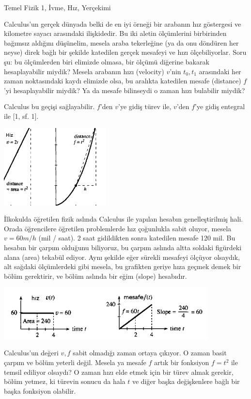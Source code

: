 \documentclass[12pt,fleqn]{article}\usepackage{../../common}
\begin{document}
Temel Fizik 1, İvme, Hız, Yerçekimi

Calculus'un gerçek dünyada belki de en iyi örneği bir arabanın hız
göstergesi ve kilometre sayacı arasındaki ilişkidedir. Bu iki aletin
ölçümlerini birbirinden bağımsız aldığını düşünelim, mesela araba
tekerleğine (ya da onu döndüren her neyse) direk bağlı bir şekilde
katedilen gerçek mesafeyi ve hızı ölçebiliyorlar. Soru şu: bu ölçümlerden
biri elimizde olmasa, bir ölçümü diğerine bakarak hesaplayabilir miydik?
Mesela arabanın hızı (velocity) $v$'nin $t_0,t_1$ arasındaki her zaman
noktasındaki kaydı elimizde olsa, bu aralıkta katedilen mesafe (distance)
$f$'yi hesaplayabilir miydik?  Ya da mesafe bilinseydi o zaman hızı
bulabilir miydik?

Calculus bu geçişi sağlayabilir. $f$'den $v$'ye gidiş türev ile, $v$'den
$f$'ye gidiş entegral ile [1, sf. 1]. 

\includegraphics[width=15em]{phy_005_basics_01.png}

İlkokulda öğretilen fizik aslında Calculus ile yapılan hesabın
genelleştirilmiş hali. Orada öğrencilere öğretilen problemlerde hız
çoğunlukla sabit oluyor, mesela $v = 60 m/h$ (mil / saat). 2 saat
gidildikten sonra katedilen mesafe 120 mil. Bu hesabın bir çarpım olduğunu
biliyoruz, bu çarpım aslında altta soldaki figürdeki alana (area) tekabül
ediyor. Aynı şekilde eğer sürekli mesafeyi ölçüyor olsaydık, alt sağdaki
ölçümlerdeki gibi mesela, bu grafikten geriye hıza geçmek demek bir bölüm
gerektirir, ve bölüm aslında bir eğim (slope) hesabıdır.

\includegraphics[width=30em]{phy_005_basics_02.png}

Calculus'un değeri $v,f$ sabit olmadığı zaman ortaya çıkıyor. O zaman basit
çarpım ve bölüm yeterli değil. Mesela ya mesafe $f$ artık bir fonksiyon
$f=t^2$ ile temsil ediliyor olsaydı? O zaman hızı elde etmek için bir türev
almak gerekir, bölüm yetmez, ki türevin sonucu da hala $t$ ve diğer başka
değişkenlere bağlı bir başka fonksiyon olabilir.
\end{document}
